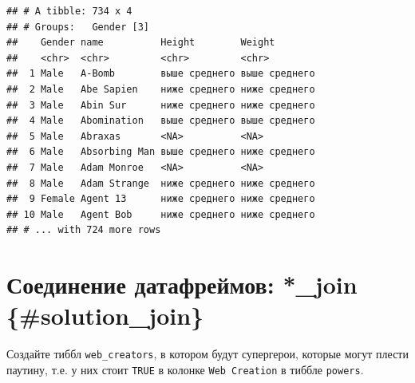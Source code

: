 \documentclass[]{book}
\newenvironment{Shaded}{\begin{snugshade}}{\end{snugshade}}
\newcommand{\KeywordTok}[1]{\textcolor[rgb]{0.13,0.29,0.53}{\textbf{#1}}}
\newcommand{\DataTypeTok}[1]{\textcolor[rgb]{0.13,0.29,0.53}{#1}}
\newcommand{\StringTok}[1]{\textcolor[rgb]{0.31,0.60,0.02}{#1}}
\newcommand{\OperatorTok}[1]{\textcolor[rgb]{0.81,0.36,0.00}{\textbf{#1}}}
\newcommand{\NormalTok}[1]{#1}
\begin{document}
\begin{verbatim}
## # A tibble: 734 x 4
## # Groups:   Gender [3]
##    Gender name          Height        Weight       
##    <chr>  <chr>         <chr>         <chr>        
##  1 Male   A-Bomb        выше среднего выше среднего
##  2 Male   Abe Sapien    ниже среднего ниже среднего
##  3 Male   Abin Sur      ниже среднего ниже среднего
##  4 Male   Abomination   выше среднего выше среднего
##  5 Male   Abraxas       <NA>          <NA>         
##  6 Male   Absorbing Man выше среднего ниже среднего
##  7 Male   Adam Monroe   <NA>          <NA>         
##  8 Male   Adam Strange  ниже среднего ниже среднего
##  9 Female Agent 13      ниже среднего ниже среднего
## 10 Male   Agent Bob     ниже среднего ниже среднего
## # ... with 724 more rows
\end{verbatim}

\section{Соединение датафреймов: *\_join
\{\#solution\_join\}}\label{ux441ux43eux435ux434ux438ux43dux435ux43dux438ux435-ux434ux430ux442ux430ux444ux440ux435ux439ux43cux43eux432-_join-solution_join}

Создайте тиббл \texttt{web\_creators}, в котором будут супергерои,
которые могут плести паутину, т.е. у них стоит \texttt{TRUE} в колонке
\texttt{Web\ Creation} в тиббле \texttt{powers}.

\begin{Shaded}
\end{Shaded}
\end{document}
